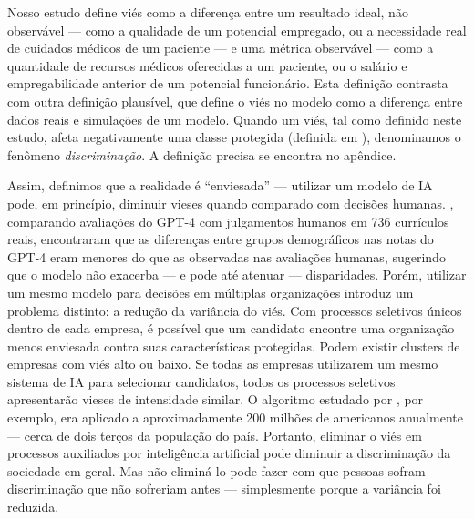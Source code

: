 \documentclass[12pt,a4paper]{article}
\begin{document}
Nosso estudo define viés como a diferença entre um resultado ideal, não
observável --- como a qualidade de um potencial empregado, ou a
necessidade real de cuidados médicos de um paciente --- e uma métrica
observável --- como a quantidade de recursos médicos oferecidas a um
paciente, ou o salário e empregabilidade anterior de um potencial
funcionário. Esta definição contrasta com outra definição plausível, que
define o viés no modelo como a diferença entre dados reais e simulações
de um modelo. Quando um viés, tal como definido neste estudo, afeta negativamente uma classe protegida
(definida em \citealp{heymann2021}), denominamos o fenômeno
\textit{discriminação}. A definição precisa se encontra no apêndice.

Assim, definimos que a realidade é ``enviesada'' --- utilizar um modelo
de IA pode, em princípio, diminuir vieses quando comparado com decisões
humanas. \citet{vaishampayan2025}, comparando avaliações do GPT-4 com
julgamentos humanos em 736 currículos reais, encontraram que as
diferenças entre grupos demográficos nas notas do GPT-4 eram menores do
que as observadas nas avaliações humanas, sugerindo que o modelo não
exacerba --- e pode até atenuar --- disparidades. Porém, utilizar um
mesmo modelo para decisões em múltiplas organizações introduz um
problema distinto: a redução da variância do viés. Com processos
seletivos únicos dentro de cada empresa, é possível que um candidato
encontre uma organização menos enviesada contra suas características
protegidas. Podem existir clusters de empresas com viés alto ou baixo.
Se todas as empresas utilizarem um mesmo sistema de IA para selecionar
candidatos, todos os processos seletivos apresentarão vieses de
intensidade similar. O algoritmo estudado por \citet{obermeyer2019},
por exemplo, era aplicado a aproximadamente 200 milhões de americanos
anualmente --- cerca de dois terços da população do país. Portanto,
eliminar o viés em processos auxiliados por inteligência artificial pode
diminuir a discriminação da sociedade em geral. Mas não eliminá-lo pode
fazer com que pessoas sofram discriminação que não sofreriam antes ---
simplesmente porque a variância foi reduzida.
\end{document}
